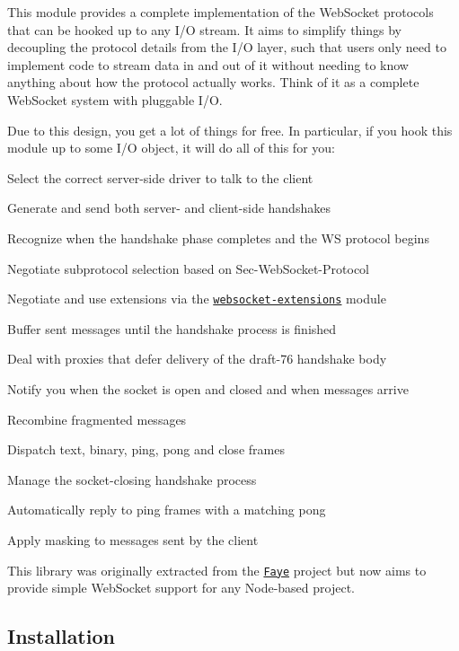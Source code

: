 This module provides a complete implementation of the Web\+Socket protocols that can be hooked up to any I/O stream. It aims to simplify things by decoupling the protocol details from the I/O layer, such that users only need to implement code to stream data in and out of it without needing to know anything about how the protocol actually works. Think of it as a complete Web\+Socket system with pluggable I/O.

Due to this design, you get a lot of things for free. In particular, if you hook this module up to some I/O object, it will do all of this for you\+:


\begin{DoxyItemize}
\item Select the correct server-\/side driver to talk to the client
\item Generate and send both server-\/ and client-\/side handshakes
\item Recognize when the handshake phase completes and the WS protocol begins
\item Negotiate subprotocol selection based on {\ttfamily Sec-\/\+Web\+Socket-\/\+Protocol}
\item Negotiate and use extensions via the \href{https://github.com/faye/websocket-extensions-node}{\tt websocket-\/extensions} module
\item Buffer sent messages until the handshake process is finished
\item Deal with proxies that defer delivery of the draft-\/76 handshake body
\item Notify you when the socket is open and closed and when messages arrive
\item Recombine fragmented messages
\item Dispatch text, binary, ping, pong and close frames
\item Manage the socket-\/closing handshake process
\item Automatically reply to ping frames with a matching pong
\item Apply masking to messages sent by the client
\end{DoxyItemize}

This library was originally extracted from the \href{http://faye.jcoglan.com}{\tt Faye} project but now aims to provide simple Web\+Socket support for any Node-\/based project.

\subsection*{Installation}


